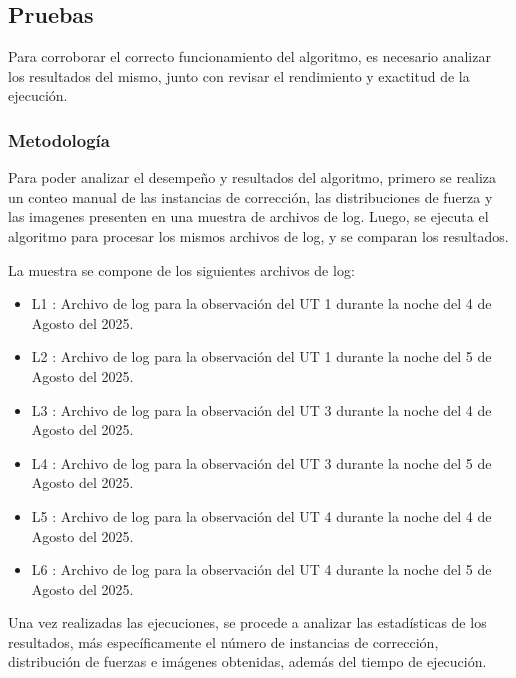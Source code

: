 \subsection{Pruebas}

Para corroborar el correcto funcionamiento del algoritmo, es necesario analizar los resultados del mismo, junto con revisar el rendimiento y exactitud de la ejecución.

\subsubsection{Metodología}

Para poder analizar el desempeño y resultados del algoritmo, primero se realiza un conteo manual de las instancias de corrección, las distribuciones de fuerza y las imagenes presenten en una muestra de archivos de log. Luego, se ejecuta el algoritmo para procesar los mismos archivos de log, y se comparan los resultados. 

La muestra se compone de los siguientes archivos de log:

\begin{itemize}
    \item L1 : Archivo de log para la observación del UT 1 durante la noche del 4 de Agosto del 2025.

    \item L2 : Archivo de log para la observación del UT 1 durante la noche del 5 de Agosto del 2025.

    \item L3 : Archivo de log para la observación del UT 3 durante la noche del 4 de Agosto del 2025.

    \item L4 : Archivo de log para la observación del UT 3 durante la noche del 5 de Agosto del 2025.

    \item L5 : Archivo de log para la observación del UT 4 durante la noche del 4 de Agosto del 2025.

    \item L6 : Archivo de log para la observación del UT 4 durante la noche del 5 de Agosto del 2025.    
\end{itemize}

Una vez realizadas las ejecuciones, se procede a analizar las estadísticas de los resultados, más específicamente el número de instancias de corrección, distribución de fuerzas e imágenes obtenidas, además del tiempo de ejecución.

